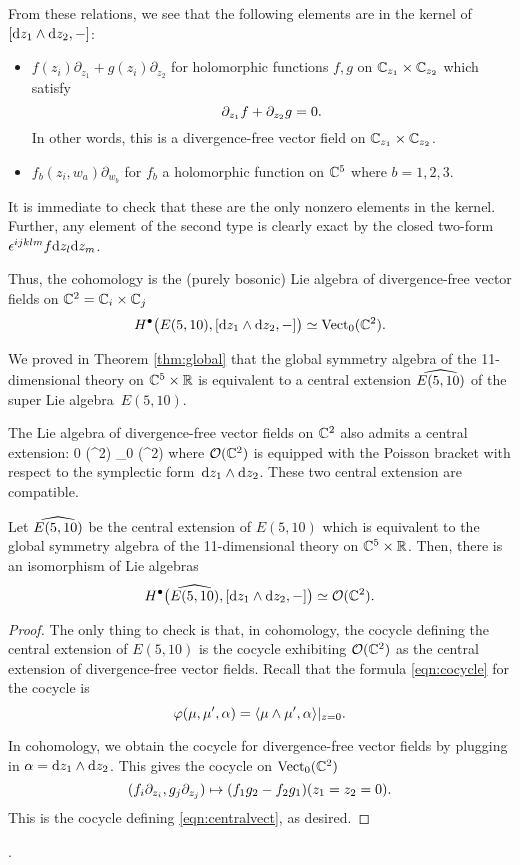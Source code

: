 From these relations, we see that the following elements are in the kernel of $[\d z_1 \wedge \d z_2, -]$:
\begin{itemize}
\item $f(z_i) \partial_{z_1} + g(z_i) \partial_{z_2}$ for holomorphic functions $f,g$ on $\CC_{z_1} \times \CC_{z_2}$ which satisfy 
\[
\del_{z_1} f + \del_{z_2} g = 0 .
\]
In other words, this is a divergence-free vector field on $\CC_{z_1} \times \CC_{z_2}$. 
\item $f_b(z_i, w_a) \partial_{w_b}$ for $f_b$ a holomorphic function on $\CC^5$ where $b=1,2,3$. 
\end{itemize}
It is immediate to check that these are the only nonzero elements in the kernel. 
Further, any element of the second type is clearly exact by the closed two-form $\ep^{ijklm} f \d z_l \d z_m$. 

Thus, the cohomology is the (purely bosonic) Lie algebra of divergence-free vector fields on $\CC^2 = \CC_i \times \CC_j$
\[
H^\bu\big(E(5,10), [\d z_1 \wedge \d z_2, -] \big) \simeq \Vect_0(\CC^2) .
\]

We proved in Theorem \ref{thm:global} that the global symmetry algebra of the 11-dimensional theory on $\CC^5 \times \RR$ is equivalent to a central extension $\Hat{E(5,10)}$ of the super Lie algebra~$E(5,10)$. 

The Lie algebra of divergence-free vector fields on $\CC^2$ also admits a central extension:
\beqn\label{eqn:centralvect}
0 \to \CC \to \cO (\CC^2) \to \Vect_0 (\CC^2) 
\eeqn
where $\cO(\CC^2)$ is equipped with the Poisson bracket with respect to the symplectic form~$\d z_1 \wedge \d z_2$.
These two central extension are compatible. 


\begin{prop}
Let $\Hat{E(5,10)}$ be the central extension of $E(5,10)$ which is equivalent to the global symmetry algebra of the 11-dimensional theory on $\CC^5 \times \RR$. 
Then, there is an isomorphism of Lie algebras 
\[
H^\bu \big(\Hat{E(5,10)} , [\d z_1 \wedge \d z_2, -] \big) \simeq \cO(\CC^2) .
\]
\end{prop}
\begin{proof}
The only thing to check is that, in cohomology, the cocycle defining the central extension of $E(5,10)$ is the cocycle exhibiting $\cO(\CC^2)$ as the central extension of divergence-free vector fields. 
Recall that the formula \eqref{eqn:cocycle} for the cocycle is 
\[
\varphi(\mu, \mu', \alpha) = \<\mu \wedge \mu', \alpha\>|_{z=0}.
\]

In cohomology, we obtain the cocycle for divergence-free vector fields by plugging in $\alpha = \d z_1 \wedge \d z_2$. 
This gives the cocycle on $\Vect_0(\CC^2)$ 
\[
(f_i \del_{z_i}, g_j \del_{z_j}) \mapsto (f_1 g_2 - f_2 g_1)(z_1=z_2=0) .
\]
This is the cocycle defining \eqref{eqn:centralvect}, as desired. 
\end{proof}.

